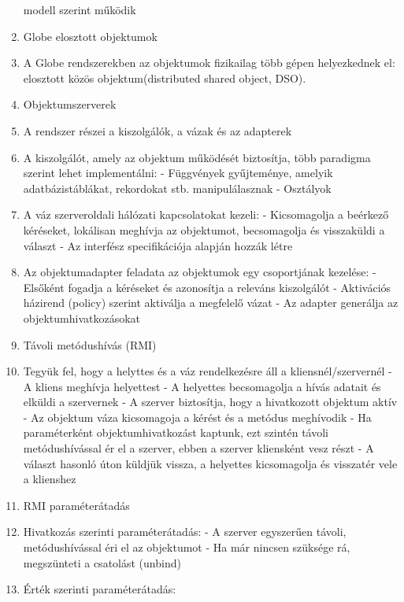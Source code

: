 \documentclass[twoside, a4paper, 12pt]{article}
\begin{document}
\begin{enumerate}
                modell szerint működik
            \item  Globe elosztott objektumok
            \item A Globe rendszerekben az objektumok fizikailag több gépen helyezkednek el: elosztott közös objektum(distributed shared object, DSO).
            \item  Objektumszerverek
            \item A rendszer részei a kiszolgálók, a vázak és az adapterek
            \item A kiszolgálót, amely az objektum működését biztosítja, több paradigma szerint lehet implementálni:
                - Függvények gyűjteménye, amelyik adatbázistáblákat, rekordokat stb.
                manipulálasznak
                - Osztályok
            \item A váz szerveroldali hálózati kapcsolatokat kezeli:
                - Kicsomagolja a beérkező kéréseket, lokálisan meghívja az objektumot, becsomagolja és visszaküldi a választ
                - Az interfész specifikációja alapján hozzák létre
            \item Az objektumadapter feladata az objektumok egy csoportjának kezelése:
                - Elsőként fogadja a kéréseket és azonosítja a releváns kiszolgálót
                - Aktivációs házirend (policy) szerint aktiválja  a megfelelő vázat
                - Az adapter generálja az objektumhivatkozásokat 
            \item  Távoli metódushívás (RMI)
            \item Tegyük fel, hogy a helyttes és a váz rendelkezésre áll a kliensnél/szervernél
                - A kliens meghívja helyettest
                - A helyettes becsomagolja a hívás adatait és elküldi a szervernek
                - A szerver biztosítja, hogy a hivatkozott objektum aktív
                - Az objektum váza kicsomagoja a kérést és a metódus meghívodik
                - Ha paraméterként objektumhivatkozást kaptunk, ezt szintén távoli metódushívással ér el a szerver,
                ebben a szerver kliensként vesz részt
                - A választ hasonló úton küldjük vissza, a helyettes kicsomagolja és visszatér vele a klienshez
            \item  RMI paraméterátadás
            \item Hivatkozás szerinti paraméterátadás:
                - A szerver egyszerűen távoli, metódushívással éri el az objektumot
                - Ha már nincsen szüksége rá, megszünteti a csatolást (unbind)
            \item Érték szerinti paraméterátadás: 

\end{enumerate}
\end{document}
